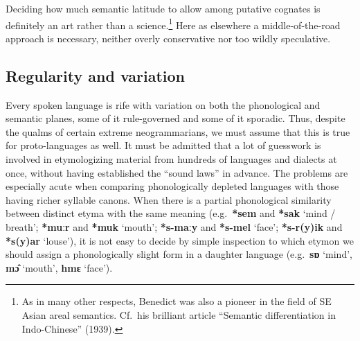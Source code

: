 Deciding how much semantic latitude to allow among putative cognates is
definitely an art rather than a science.\footnote{As in many other respects, Benedict was also a pioneer in the field of SE Asian areal semantics. Cf.\ his brilliant article “Semantic differentiation in Indo-Chinese” (1939).} Here as elsewhere a middle-of-the-road
approach is necessary, neither overly conservative nor too wildly speculative.



\subsection{Regularity and variation}

Every spoken language is rife with variation on both the phonological and semantic planes, some of it rule-governed and some of it sporadic. Thus, despite the qualms of certain extreme neogrammarians, we must assume that this is true for proto-languages as well. It must be admitted that a lot of guesswork is involved in etymologizing
material from hundreds of languages and dialects at once, without having
established the “sound laws” in advance. The problems are especially acute when
comparing phonologically depleted languages with those having richer syllable
canons. When there is a partial phonological similarity between distinct etyma
with the same meaning (e.g.\ \textbf{*sem} and \textbf{*sak}  ‘mind / breath’;
\textbf{*muːr} and \textbf{*muk}
‘mouth’; \textbf{*s-maːy} and \textbf{*s-mel} ‘face’;
\textbf{*s-r(y)ik} and \textbf{*s(y)ar} ‘louse’), it is not
easy to decide by simple inspection to which etymon we should assign a
phonologically slight form in a daughter language (e.g.\ \textbf{sɒ} ‘mind’,
\textbf{mɔ̂} ‘mouth’,
\textbf{hmɛ} ‘face’).


